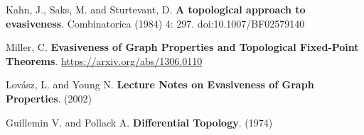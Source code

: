 \documentclass[a4paper]{article}
\begin{document}
\begin{thebibliography}{10}
Kahn, J., Saks, M. and Sturtevant, D. \textbf{A topological approach to evasiveness}. Combinatorica (1984) 4: 297. doi:10.1007/BF02579140

Miller, C. \textbf{ Evasiveness of Graph Properties and Topological Fixed-Point Theorems}. \url{https://arxiv.org/abs/1306.0110}

Lovász, L. and Young N. \textbf{Lecture Notes on Evasiveness of Graph Properties}. (2002)

Guillemin V. and Pollack A. \textbf{Differential Topology}. (1974)

\end{thebibliography}
\end{document}
